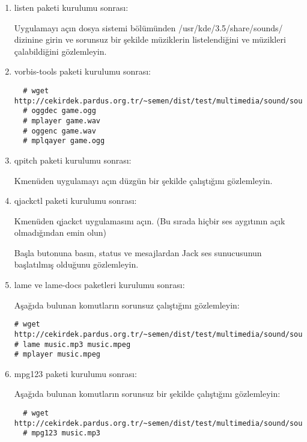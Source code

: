 \documentclass[a4paper,10pt]{article}
\begin{document}
\begin{enumerate}
\item listen paketi kurulumu sonrası: 

Uygulamayı açın dosya sistemi bölümünden /usr/kde/3.5/share/sounds/ dizinine girin ve sorunsuz bir şekilde müziklerin listelendiğini ve müzikleri çalabildiğini gözlemleyin.

\item vorbis-tools paketi kurulumu sonrası: 
 \begin{verbatim}
  # wget http://cekirdek.pardus.org.tr/~semen/dist/test/multimedia/sound/sound/sample.ogg
  # oggdec game.ogg
  # mplayer game.wav
  # oggenc game.wav
  # mplqayer game.ogg
 \end{verbatim}

\item qpitch paketi kurulumu sonrası:

Kmenüden uygulamayı açın düzgün bir şekilde çalıştığını gözlemleyin.

\item qjackctl paketi kurulumu sonrası: 

Kmenüden qjackct uygulamasını açın. (Bu sırada hiçbir ses aygıtının açık olmadığından emin olun)

Başla butonuna basın, status ve mesajlardan Jack ses sunucusunun başlatılmış olduğunu gözlemleyin.

\item lame ve lame-docs paketleri kurulumu sonrası: 

Aşağıda bulunan komutların sorunsuz çalıştığını gözlemleyin:
\begin{verbatim}
# wget http://cekirdek.pardus.org.tr/~semen/dist/test/multimedia/sound/sound/sample.mp3
# lame music.mp3 music.mpeg
# mplayer music.mpeg
\end{verbatim}

\item mpg123 paketi kurulumu sonrası:

Aşağıda bulunan komutların sorunsuz bir şekilde çalıştığını gözlemleyin:
 \begin{verbatim}
  # wget http://cekirdek.pardus.org.tr/~semen/dist/test/multimedia/sound/sound/sample.mp3
  # mpg123 music.mp3
 \end{verbatim}


\end{enumerate}
\end{document}
